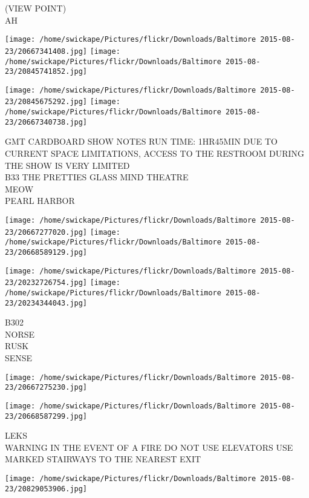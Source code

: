 \documentclass[10pt,letterpaper]{article}
\begin{document}
(VIEW POINT)\\
AH\\
\pagebreak

\texttt{[image: /home/swickape/Pictures/flickr/Downloads/Baltimore 2015-08-23/20667341408.jpg]}
\texttt{[image: /home/swickape/Pictures/flickr/Downloads/Baltimore 2015-08-23/20845741852.jpg]}

\texttt{[image: /home/swickape/Pictures/flickr/Downloads/Baltimore 2015-08-23/20845675292.jpg]}
\texttt{[image: /home/swickape/Pictures/flickr/Downloads/Baltimore 2015-08-23/20667340738.jpg]}

GMT CARDBOARD SHOW NOTES RUN TIME: 1HR45MIN DUE TO CURRENT SPACE LIMITATIONS, ACCESS TO THE RESTROOM DURING THE SHOW IS VERY LIMITED\\
B33 THE PRETTIES GLASS MIND THEATRE\\
MEOW\\
PEARL HARBOR\\
\pagebreak

\texttt{[image: /home/swickape/Pictures/flickr/Downloads/Baltimore 2015-08-23/20667277020.jpg]}
\texttt{[image: /home/swickape/Pictures/flickr/Downloads/Baltimore 2015-08-23/20668589129.jpg]}

\texttt{[image: /home/swickape/Pictures/flickr/Downloads/Baltimore 2015-08-23/20232726754.jpg]}
\texttt{[image: /home/swickape/Pictures/flickr/Downloads/Baltimore 2015-08-23/20234344043.jpg]}

B302\\
NORSE\\
RUSK\\
SENSE\\
\pagebreak

\texttt{[image: /home/swickape/Pictures/flickr/Downloads/Baltimore 2015-08-23/20667275230.jpg]}

\vspace{0.25in}
\texttt{[image: /home/swickape/Pictures/flickr/Downloads/Baltimore 2015-08-23/20668587299.jpg]}

LEKS\\
WARNING IN THE EVENT OF A FIRE DO NOT USE ELEVATORS USE MARKED STAIRWAYS TO THE NEAREST EXIT\\
\pagebreak

\texttt{[image: /home/swickape/Pictures/flickr/Downloads/Baltimore 2015-08-23/20829053906.jpg]}
\end{document}
